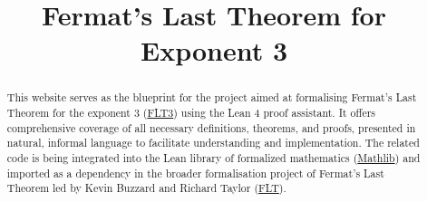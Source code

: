\documentclass{report}
\title{Fermat's Last Theorem for Exponent 3}
\begin{document}
\maketitle

\begin{abstract}
    This website serves as the blueprint for the project aimed at formalising Fermat’s Last Theorem
    for the exponent 3 (\href{https://github.com/pitmonticone/FLT3}{FLT3}) using the Lean 4 proof assistant.
    It offers comprehensive coverage of all necessary definitions, theorems, and proofs, presented in natural,
    informal language to facilitate understanding and implementation. The related code is being integrated
    into the Lean library of formalized mathematics (\href{https://github.com/leanprover-community/mathlib4}{Mathlib})
    and imported as a dependency in the broader formalisation project of Fermat's Last Theorem led by
    Kevin Buzzard and Richard Taylor (\href{https://github.com/ImperialCollegeLondon/FLT}{FLT}).
\end{abstract}



\end{document}
